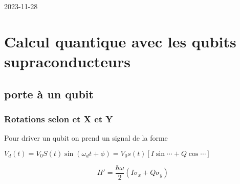 


2023-11-28

\setcounter{section}{6}

\section{Calcul quantique avec les qubits supraconducteurs}


\subsection{porte à un qubit}

\subsubsection{Rotations selon et X et Y}

Pour driver un qubit on prend un signal de la forme

$V_d (t) = V_0 S(t)\sin(\omega_d t + \phi) = V_0 s(t)\left[ I\sin \dotsb + Q\cos \dotsb \right] $

\[ H' = \frac{\hbar \omega}{2}\left( I\sigma_x + Q \sigma_y  \right)   \]





